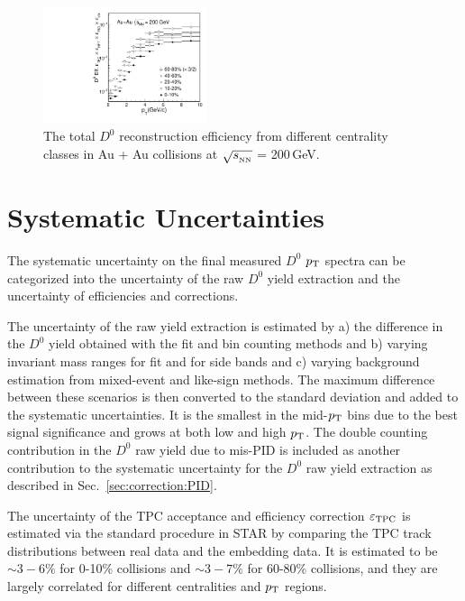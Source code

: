 \documentclass[%
 reprint,	
 amsmath,amssymb,
 aps,
 prc,
]{revtex4-1}
\begin{document}
\begin{figure}
\centering
\includegraphics[width=0.43\textwidth]{fig/Datad0Eff_10.pdf}
\caption{The total $D^{0}$ reconstruction efficiency from different centrality classes in Au + Au collisions at $\sqrt{s_{_{\rm NN}}}$ = 200\,GeV.}
\label{fig:Datad0Eff} 
\end{figure}

\section{\label{sec:systematic}Systematic Uncertainties}

The systematic uncertainty on the final measured $D^0$ $p_{\rm T}$ spectra can be categorized into the uncertainty of the raw $D^0$ yield extraction and the uncertainty of efficiencies and corrections.

The uncertainty of the raw yield extraction is estimated by a) the difference in the $D^0$ yield obtained with the fit and bin counting methods and b) varying invariant mass ranges for fit and for side bands and c) varying background estimation from mixed-event and like-sign methods. The maximum difference between these scenarios is then converted to the standard deviation and added to the systematic uncertainties. It is the smallest in the mid-$p_{\rm T}$ bins due to the best signal significance and grows at both low and high $p_{\rm T}$. The double counting contribution in the $D^0$ raw yield  due to mis-PID is included as another contribution to the systematic uncertainty for the $D^0$ raw yield extraction as described in Sec.~\ref{sec:correction:PID}.

The uncertainty of the TPC acceptance and efficiency correction $\varepsilon_{\rm TPC}$ is estimated via the standard procedure in STAR by comparing the TPC track distributions between real data and the embedding data. It is estimated to be $\sim 3-6\%$ for 0-10\% collisions and $\sim 3-7\%$ for 60-80\% collisions, and they are largely correlated for different centralities and $p_{\rm T}$ regions. 
\end{document}
